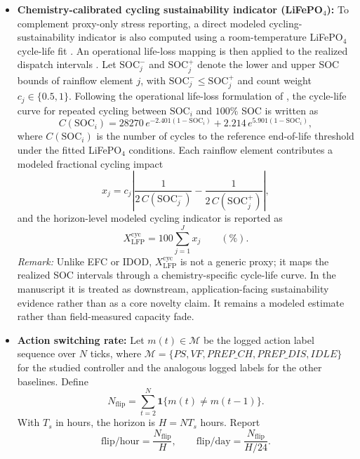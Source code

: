 \documentclass[preprint,12pt]{elsarticle}
\def\texttt#1{#1}%
\newcommand{\SOC}{\mathrm{SOC}}
\newcommand{\Ts}{T_s}
\begin{document}
\begin{itemize}
\item \textbf{Chemistry-calibrated cycling sustainability indicator (LiFePO$_4$):}
To complement proxy-only stress reporting, a direct modeled cycling-sustainability indicator is also computed using a room-temperature LiFePO$_4$ cycle-life fit \cite{wang2011lfp}. An operational life-loss mapping is then applied to the realized dispatch intervals \cite{yan2018lifeloss}. Let $\SOC_j^{-}$ and $\SOC_j^{+}$ denote the lower and upper SOC bounds of rainflow element $j$, with $\SOC_j^{-}\le \SOC_j^{+}$ and count weight $c_j\in\{0.5,1\}$. Following the operational life-loss formulation of \cite{yan2018lifeloss}, the cycle-life curve for repeated cycling between $\SOC_i$ and $100\%$ SOC is written as
\begin{equation}
C(\SOC_i)=28270\,e^{-2.401(1-\SOC_i)} + 2.214\,e^{5.901(1-\SOC_i)},
\label{eq:lfp_cycle_life}
\end{equation}
where $C(\SOC_i)$ is the number of cycles to the reference end-of-life threshold under the fitted LiFePO$_4$ conditions. Each rainflow element contributes a modeled fractional cycling impact
\begin{equation}
x_j = c_j \left| \frac{1}{2\,C(\SOC_j^-)} - \frac{1}{2\,C(\SOC_j^+)} \right|,
\label{eq:lfp_cycle_loss_element}
\end{equation}
and the horizon-level modeled cycling indicator is reported as
\begin{equation}
X_{\mathrm{LFP}}^{\mathrm{cyc}} = 100 \sum_{j=1}^{J} x_j \qquad (\%).
\label{eq:lfp_cycle_loss}
\end{equation}
\textit{Remark:} Unlike EFC or IDOD, $X_{\mathrm{LFP}}^{\mathrm{cyc}}$ is not a generic proxy; it maps the realized SOC intervals through a chemistry-specific cycle-life curve. In the manuscript it is treated as downstream, application-facing sustainability evidence rather than as a core novelty claim. It remains a modeled estimate rather than field-measured capacity fade.

\item \textbf{Action switching rate:} Let $m(t)\in\mathcal{M}$ be the logged action label sequence over $N$ ticks, where $\mathcal{M}=\{\texttt{PS},\texttt{VF},\texttt{PREP\_CH},\texttt{PREP\_DIS},\texttt{IDLE}\}$ for the studied controller and the analogous logged labels for the other baselines. Define
\begin{equation}
N_{\mathrm{flip}}=\sum_{t=2}^{N}\mathbf{1}\{m(t)\neq m(t-1)\}.
\label{eq:nflip}
\end{equation}
With $\Ts$ in hours, the horizon is $H=N\Ts$ hours. Report
\begin{equation}
\text{flip/hour}=\frac{N_{\mathrm{flip}}}{H},\qquad
\text{flip/day}=\frac{N_{\mathrm{flip}}}{H/24}.
\label{eq:flip_rates}
\end{equation}


\end{itemize}
\end{document}
